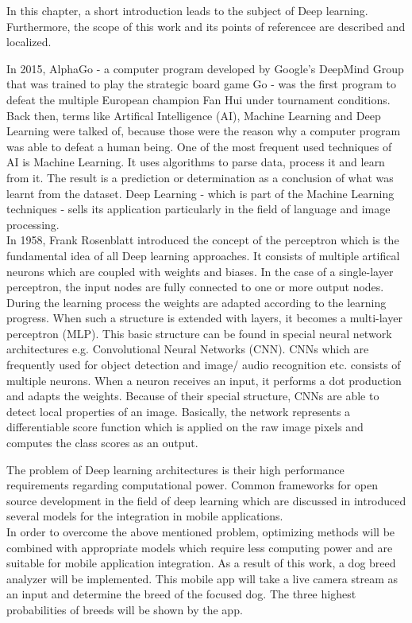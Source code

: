 In this chapter, a short introduction leads to the subject of Deep learning. Furthermore, the scope of this work and its points of referencee are described and localized.

		
In 2015, AlphaGo - a computer program developed by Google's DeepMind Group that was trained to play the strategic board game Go - was the first program to defeat the multiple European champion Fan Hui under tournament conditions. Back then, terms like Artifical Intelligence (AI), Machine Learning and Deep Learning were talked of, because those were the reason why a computer program was able to defeat a human being. One of the most frequent used techniques of AI is Machine Learning. It uses algorithms to parse data, process it and learn from it. The result is a prediction or determination as a conclusion of what was learnt from the dataset. Deep Learning - which is part of the Machine Learning techniques - sells its application particularly in the field of language and image processing. \\

In 1958, Frank Rosenblatt introduced the concept of the perceptron which is the fundamental idea of all Deep learning approaches. It consists of multiple artifical neurons which are coupled with weights and biases. In the case of a single-layer perceptron, the input nodes are fully connected to one or more output nodes. During the learning process the weights are adapted according to the learning progress. When such a structure is extended with layers, it becomes a multi-layer perceptron (MLP). This basic structure can be found in special neural network architectures e.g. Convolutional Neural Networks (CNN). CNNs which are frequently used for object detection and image/ audio recognition etc. consists of multiple neurons. When a neuron receives an input, it performs a dot production and adapts the weights. Because of their special structure, CNNs are able to detect local properties of an image. Basically, the network represents a differentiable score function which is applied on the raw image pixels and computes the class scores as an output.
 
The problem of Deep learning architectures is their high performance requirements regarding computational power. Common frameworks for open source development in the field of deep learning which are discussed in  introduced several models for the integration in mobile applications. \\

In order to overcome the above mentioned problem, optimizing methods will be combined with appropriate models which require less computing power and are suitable for mobile application integration. As a result of this work, a dog breed analyzer will be implemented. This mobile app will take a live camera stream as an input and determine the breed of the focused dog. The three highest probabilities of breeds will be shown by the app.

	